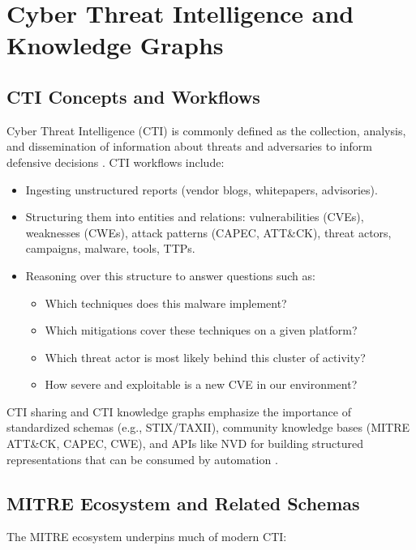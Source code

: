 \documentclass[unnumsec,webpdf,contemporary,large]{oup-authoring-template}
\theoremstyle{thmstyleone}
\theoremstyle{thmstyletwo}
\theoremstyle{thmstylethree}
\begin{document}
\section{Cyber Threat Intelligence and Knowledge Graphs}
\label{sec:cti-kg}

\subsection{CTI Concepts and Workflows}

Cyber Threat Intelligence (CTI) is commonly defined as the collection, analysis, and dissemination of information about threats and adversaries to inform defensive decisions \cite{mcmillan2013gartner}. CTI workflows include:

\begin{itemize}
  \item Ingesting unstructured reports (vendor blogs, whitepapers, advisories).
  \item Structuring them into entities and relations: vulnerabilities (CVEs), weaknesses (CWEs), attack patterns (CAPEC, ATT\&CK), threat actors, campaigns, malware, tools, TTPs.
  \item Reasoning over this structure to answer questions such as:
    \begin{itemize}
      \item Which techniques does this malware implement?
      \item Which mitigations cover these techniques on a given platform?
      \item Which threat actor is most likely behind this cluster of activity?
      \item How severe and exploitable is a new CVE in our environment?
    \end{itemize}
\end{itemize}

CTI sharing and CTI knowledge graphs emphasize the importance of standardized schemas (e.g., STIX/TAXII), community knowledge bases (MITRE ATT\&CK, CAPEC, CWE), and APIs like NVD for building structured representations that can be consumed by automation \cite{strom2018mitreattck,mitreCVE,mitreCWE,mitreCAPEC}.

\subsection{MITRE Ecosystem and Related Schemas}

The MITRE ecosystem underpins much of modern CTI:
\end{document}
